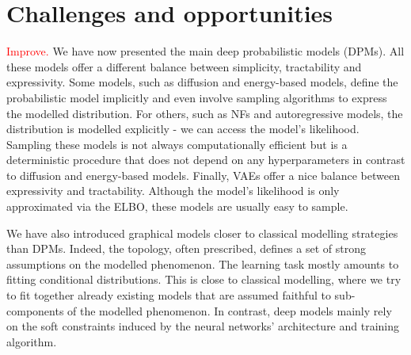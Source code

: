 
\section{Challenges and opportunities}
\textcolor{red}{Improve.}
%
We have now presented the main deep probabilistic models (DPMs). All these models offer a different balance between simplicity, tractability and expressivity. Some models, such as diffusion and energy-based models, define the probabilistic model implicitly and even involve sampling algorithms to express the modelled distribution. For others, such as NFs and autoregressive models, the distribution is modelled explicitly - we can access the model's likelihood. Sampling these models is not always computationally efficient but is a deterministic procedure that does not depend on any hyperparameters in contrast to diffusion and energy-based models. Finally, VAEs offer a nice balance between expressivity and tractability. Although the model's likelihood is only approximated via the ELBO, these models are usually easy to sample.

We have also introduced graphical models closer to classical modelling strategies than DPMs. Indeed, the topology, often prescribed, defines a set of strong assumptions on the modelled phenomenon. The learning task mostly amounts to fitting conditional distributions. This is close to classical modelling, where we try to fit together already existing models that are assumed faithful to sub-components of the modelled phenomenon. In contrast, deep models mainly rely on the soft constraints induced by the neural networks' architecture and training algorithm.

